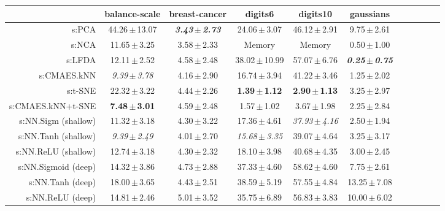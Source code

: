 \begin{table}[ht] \centering
{\small\renewcommand{\arraystretch}{0.7}
\setlength{\tabcolsep}{1pt}
\hspace*{-36pt}
\begin{tabular}{rcccccccccc}
\toprule


& \multicolumn{1}{c}{balance-scale} & \multicolumn{1}{c}{breast-cancer} & \multicolumn{1}{c}{digits6} & \multicolumn{1}{c}{digits10} & \multicolumn{1}{c}{gaussians} \\ 
\midrule
s:PCA & 44.26\,$\pm$\,13.07 & \emph{\textbf{3.43\,$\pm$\,2.73}} & 24.06\,$\pm$\,3.07 & 46.12\,$\pm$\,2.91 & 9.75\,$\pm$\,2.61 \\
s:NCA & 11.65\,$\pm$\,3.25 & 3.58\,$\pm$\,2.33 & Memory  & Memory  & 0.50\,$\pm$\,1.00 \\
s:LFDA & 12.11\,$\pm$\,2.52 & 4.58\,$\pm$\,2.48 & 38.02\,$\pm$\,10.99 & 57.07\,$\pm$\,6.76 & \emph{\textbf{0.25\,$\pm$\,0.75}} \\
s:CMAES.kNN & \emph{9.39\,$\pm$\,3.78} & 4.16\,$\pm$\,2.90 & 16.74\,$\pm$\,3.94 & 41.22\,$\pm$\,3.46 & 1.25\,$\pm$\,2.02 \\
s:t-SNE & 22.32\,$\pm$\,3.22 & 4.44\,$\pm$\,2.26 & \textbf{1.39\,$\pm$\,1.12} & \textbf{2.90\,$\pm$\,1.13} & 3.25\,$\pm$\,2.97 \\
s:CMAES.kNN+t-SNE & \textbf{7.48\,$\pm$\,3.01} & 4.59\,$\pm$\,2.48 & 1.57\,$\pm$\,1.02 & 3.67\,$\pm$\,1.98 & 2.25\,$\pm$\,2.84 \\
s:NN.Sigm (shallow) & 11.32\,$\pm$\,3.18 & 4.30\,$\pm$\,3.22 & 17.36\,$\pm$\,4.61 & \emph{37.93\,$\pm$\,4.16} & 2.50\,$\pm$\,1.94 \\
s:NN.Tanh (shallow) & \emph{9.39\,$\pm$\,2.49} & 4.01\,$\pm$\,2.70 & \emph{15.68\,$\pm$\,3.35} & 39.07\,$\pm$\,4.64 & 3.25\,$\pm$\,3.17 \\
s:NN.ReLU (shallow) & 12.74\,$\pm$\,3.18 & 4.30\,$\pm$\,2.32 & 18.10\,$\pm$\,3.98 & 40.68\,$\pm$\,4.35 & 3.00\,$\pm$\,2.45 \\
s:NN.Sigmoid (deep) & 14.32\,$\pm$\,3.86 & 4.73\,$\pm$\,2.88 & 37.33\,$\pm$\,4.60 & 58.62\,$\pm$\,4.60 & 7.75\,$\pm$\,2.61 \\
s:NN.Tanh (deep) & 18.00\,$\pm$\,3.65 & 4.43\,$\pm$\,2.51 & 38.59\,$\pm$\,5.19 & 57.55\,$\pm$\,4.84 & 13.25\,$\pm$\,7.08 \\
s:NN.ReLU (deep) & 14.81\,$\pm$\,2.46 & 5.01\,$\pm$\,3.52 & 35.75\,$\pm$\,6.89 & 56.83\,$\pm$\,3.83 & 10.00\,$\pm$\,6.02 \\

\end{tabular}}
\end{table}
